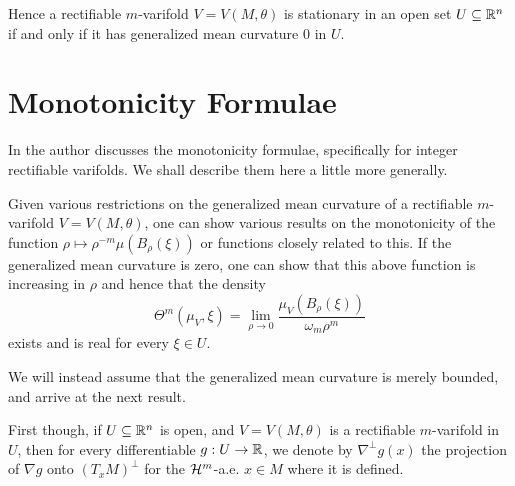 Hence a rectifiable $m$-varifold $V=V(M, \theta)$ is stationary in an open set $U \subseteq \mathbb{R}^n$ if and only if it has generalized mean curvature 0 in $U$.


\section{Monotonicity Formulae}
In \cite{DeL12} the author discusses the monotonicity formulae, specifically for integer rectifiable varifolds. We shall describe them here a little more generally.

Given various restrictions on the generalized mean curvature of a rectifiable $m$-varifold $V=V(M,\theta)$, one can show various results on the monotonicity of the function $\rho \mapsto \rho^{-m}\mu(B_{\rho}(\xi))$ or functions closely related to this. If the generalized mean curvature is zero, one can show that this above function is increasing in $\rho$ and hence that the density
\[
    \Theta^m(\mu_V, \xi) = \lim_{\rho \to 0} \frac{\mu_V(B_{\rho}(\xi))}{\omega_m\rho^m}
\]
exists and is real for every $\xi \in U$.

We will instead assume that the generalized mean curvature is merely bounded, and arrive at the next result.

First though, if $U \subseteq \mathbb{R}^n$ is open, and $V=V(M,\theta)$ is a rectifiable $m$-varifold in $U$, then for every differentiable $g:U \to \mathbb{R}$, we denote by $\nabla^{\perp}g(x)$ the projection of $\nabla g$ onto $(T_xM)^{\perp}$ for the $\mathcal{H}^m$-a.e. $x \in M$ where it is defined.

